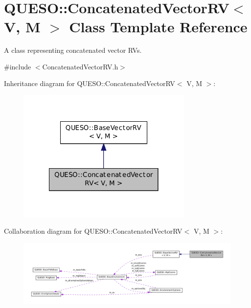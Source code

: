 \hypertarget{class_q_u_e_s_o_1_1_concatenated_vector_r_v}{\section{Q\-U\-E\-S\-O\-:\-:Concatenated\-Vector\-R\-V$<$ V, M $>$ Class Template Reference}
\label{class_q_u_e_s_o_1_1_concatenated_vector_r_v}
}


A class representing concatenated vector R\-Vs.  




{\ttfamily \#include $<$Concatenated\-Vector\-R\-V.\-h$>$}



Inheritance diagram for Q\-U\-E\-S\-O\-:\-:Concatenated\-Vector\-R\-V$<$ V, M $>$\-:
\nopagebreak
\begin{figure}[H]
\begin{center}
\leavevmode
\includegraphics[width=246pt]{class_q_u_e_s_o_1_1_concatenated_vector_r_v__inherit__graph}
\end{center}
\end{figure}


Collaboration diagram for Q\-U\-E\-S\-O\-:\-:Concatenated\-Vector\-R\-V$<$ V, M $>$\-:
\nopagebreak
\begin{figure}[H]
\begin{center}
\leavevmode
\includegraphics[width=350pt]{class_q_u_e_s_o_1_1_concatenated_vector_r_v__coll__graph}
\end{center}
\end{figure}
